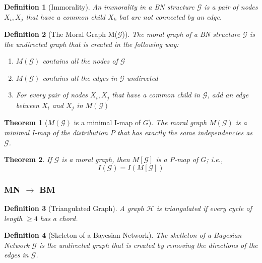 \documentclass[11pt]{article}
\numberwithin{equation}{section}
\theoremstyle{boldStyle}
\theoremstyle{boldBlueStyle}
\theoremstyle{boldPurpleStyle}
\newtheorem{theorem}{Theorem}[section]
\theoremstyle{boldRedStyle}
\newtheorem{definition}{Definition}[section]
\begin{document}
\begin{definition}[Immorality]
    An immorality in a BN structure $\mathcal{G}$ is a pair of nodes $X_i, X_j$ that have a common child $X_k$ but are not connected by an edge.
\end{definition}

\begin{definition}[The Moral Graph M($\mathcal{G}$)]
    The moral graph of a BN structure $\mathcal{G}$ is the undirected graph that is created in the following way:
    \begin{enumerate}
        \item $M(\mathcal{G})$ contains all the nodes of $\mathcal{G}$
        \item $M(\mathcal{G})$ contains all the edges in $\mathcal{G}$ undirected
        \item For every pair of nodes $X_i, X_j$ that have a common child in $\mathcal{G}$, add an edge between $X_i$ and $X_j$ in $M(\mathcal{G})$
    \end{enumerate}
\end{definition}

\begin{theorem}[$M(\mathcal{G})$ is a minimal I-map of $G$]  
    The moral graph $M(\mathcal{G})$ is a minimal I-map of the distribution $P$ that has exactly the same independencies as $\mathcal{G}$.
\end{theorem}


\begin{theorem}
    If $\mathcal{G}$ is a moral graph, then $M[\mathcal{G}]$ is a P-map of $G$; i.e.,
    \[
        I(\mathcal{G}) = I(M[\mathcal{G}])
    \]
\end{theorem}


\subsubsection{MN $\rightarrow$ BM}

\begin{definition}[Triangulated Graph]
    A graph $\mathcal{H}$ is triangulated if every cycle of length $\geq 4$ has a chord.
\end{definition}

\begin{definition}[Skeleton of a Bayesian Network]
    The skelleton of a Bayesian Network $\mathcal{G}$ is the undirected graph that is created by removing the directions of the edges in $\mathcal{G}$.
\end{definition}
\end{document}
